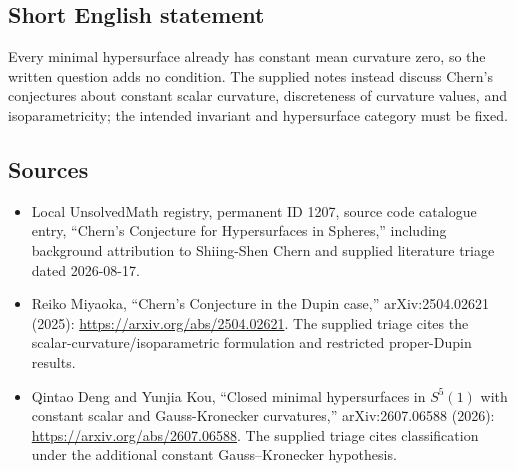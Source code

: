 \documentclass[11pt]{article}
\begin{document}
\subsection{Short English statement}
Every minimal hypersurface already has constant mean curvature zero, so the written question adds no condition. The supplied notes instead discuss Chern's conjectures about constant scalar curvature, discreteness of curvature values, and isoparametricity; the intended invariant and hypersurface category must be fixed.
\subsection{Sources}
\begin{itemize}
\item Local UnsolvedMath registry, permanent ID 1207, source code catalogue entry, ``Chern's Conjecture for Hypersurfaces in Spheres,'' including background attribution to Shiing-Shen Chern and supplied literature triage dated 2026-08-17.
\item Reiko Miyaoka, ``Chern's Conjecture in the Dupin case,'' arXiv:2504.02621 (2025): \url{https://arxiv.org/abs/2504.02621}. The supplied triage cites the scalar-curvature/isoparametric formulation and restricted proper-Dupin results.
\item Qintao Deng and Yunjia Kou, ``Closed minimal hypersurfaces in \(S^5(1)\) with constant scalar and Gauss-Kronecker curvatures,'' arXiv:2607.06588 (2026): \url{https://arxiv.org/abs/2607.06588}. The supplied triage cites classification under the additional constant Gauss--Kronecker hypothesis.
\end{itemize}
\end{document}
